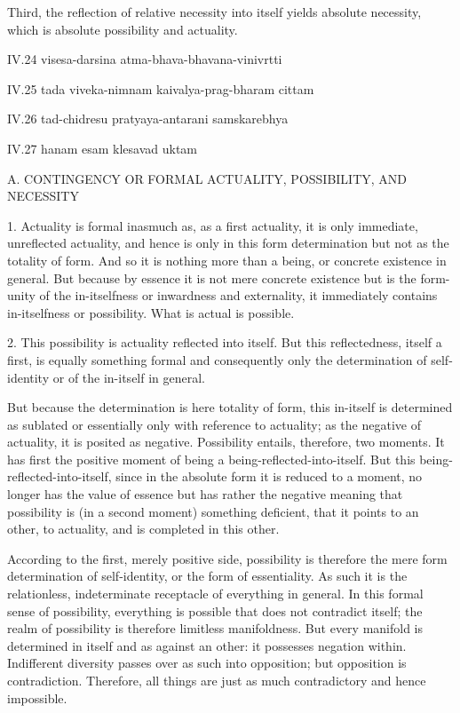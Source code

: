 Third, the reflection of relative necessity
into itself yields absolute necessity,
which is absolute possibility and actuality.

IV.24
visesa-darsina atma-bhava-bhavana-vinivrtti

IV.25
tada viveka-nimnam kaivalya-prag-bharam cittam

IV.26
tad-chidresu pratyaya-antarani samskarebhya

IV.27
hanam esam klesavad uktam

A. CONTINGENCY OR FORMAL ACTUALITY, POSSIBILITY, AND NECESSITY

1. Actuality is formal inasmuch as, as a first actuality,
it is only immediate, unreflected actuality,
and hence is only in this form determination
but not as the totality of form.
And so it is nothing more than a being,
or concrete existence in general.
But because by essence it is not mere concrete existence
but is the form-unity of the in-itselfness
or inwardness and externality,
it immediately contains in-itselfness or possibility.
What is actual is possible.

2. This possibility is actuality reflected into itself.
But this reflectedness, itself a first, is equally something formal
and consequently only the determination of self-identity
or of the in-itself in general.

But because the determination is here totality of form,
this in-itself is determined as sublated
or essentially only with reference to actuality;
as the negative of actuality, it is posited as negative.
Possibility entails, therefore, two moments.
It has first the positive moment
of being a being-reflected-into-itself.
But this being-reflected-into-itself,
since in the absolute form it is reduced to a moment,
no longer has the value of essence but has rather
the negative meaning that possibility is (in a second moment)
something deficient, that it points to an other, to actuality,
and is completed in this other.

According to the first, merely positive side,
possibility is therefore the mere
form determination of self-identity,
or the form of essentiality.
As such it is the relationless, indeterminate
receptacle of everything in general.
In this formal sense of possibility,
everything is possible
that does not contradict itself;
the realm of possibility is therefore
limitless manifoldness.
But every manifold is determined in itself
and as against an other:
it possesses negation within.
Indifferent diversity passes over
as such into opposition;
but opposition is contradiction.
Therefore, all things are
just as much contradictory
and hence impossible.

